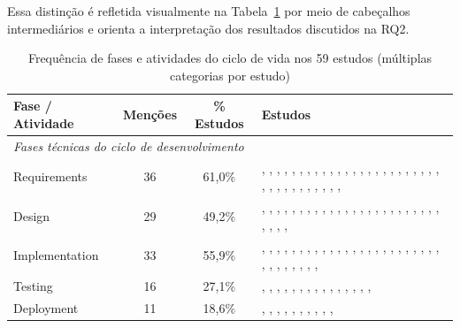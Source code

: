 Essa distinção é refletida visualmente na Tabela~\ref{tab:sdlc} por meio de cabeçalhos intermediários e orienta a interpretação dos resultados discutidos na RQ2.

\begin{table}[htbp]
\centering
\caption{Frequência de fases e atividades do ciclo de vida nos 59 estudos (múltiplas categorias por estudo)}
\label{tab:sdlc}
\scriptsize
\begin{tabular}{lccp{6.5cm}}
\hline
\textbf{Fase / Atividade} & \textbf{Menções} & \textbf{\% Estudos} & \textbf{Estudos} \\
\hline
\multicolumn{4}{l}{\textit{Fases técnicas do ciclo de desenvolvimento}} \\
\hline
Requirements & 36 & 61,0\% & \cite{S001}, \cite{S002}, \cite{S004}, \cite{S005}, \cite{S006}, \cite{S007}, \cite{S011}, \cite{S012}, \cite{S013}, \cite{S014}, \cite{S017}, \cite{S020}, \cite{S023}, \cite{S024}, \cite{S028}, \cite{S029}, \cite{S031}, \cite{S033}, \cite{S035}, \cite{S037}, \cite{S038}, \cite{S039}, \cite{S042}, \cite{S043}, \cite{S044}, \cite{S045}, \cite{S046}, \cite{S047}, \cite{S049}, \cite{S050}, \cite{S052}, \cite{S053}, \cite{S055}, \cite{S056}, \cite{S058}, \cite{S059} \\
\hline
Design & 29 & 49,2\% & \cite{S001}, \cite{S004}, \cite{S005}, \cite{S006}, \cite{S007}, \cite{S008}, \cite{S009}, \cite{S010}, \cite{S011}, \cite{S012}, \cite{S013}, \cite{S014}, \cite{S017}, \cite{S027}, \cite{S031}, \cite{S033}, \cite{S037}, \cite{S038}, \cite{S039}, \cite{S041}, \cite{S043}, \cite{S046}, \cite{S049}, \cite{S050}, \cite{S051}, \cite{S053}, \cite{S055}, \cite{S058}, \cite{S059} \\
\hline
Implementation & 33 & 55,9\% & \cite{S001}, \cite{S005}, \cite{S008}, \cite{S009}, \cite{S010}, \cite{S011}, \cite{S012}, \cite{S013}, \cite{S014}, \cite{S015}, \cite{S018}, \cite{S021}, \cite{S022}, \cite{S025}, \cite{S026}, \cite{S028}, \cite{S032}, \cite{S034}, \cite{S035}, \cite{S036}, \cite{S037}, \cite{S038}, \cite{S039}, \cite{S040}, \cite{S041}, \cite{S042}, \cite{S046}, \cite{S048}, \cite{S050}, \cite{S053}, \cite{S054}, \cite{S055}, \cite{S058} \\
\hline
Testing & 16 & 27,1\% & \cite{S001}, \cite{S004}, \cite{S005}, \cite{S010}, \cite{S013}, \cite{S014}, \cite{S017}, \cite{S021}, \cite{S022}, \cite{S034}, \cite{S036}, \cite{S039}, \cite{S040}, \cite{S045}, \cite{S052}, \cite{S053} \\
\hline
Deployment & 11 & 18,6\% & \cite{S001}, \cite{S003}, \cite{S009}, \cite{S013}, \cite{S014}, \cite{S017}, \cite{S026}, \cite{S038}, \cite{S041}, \cite{S046}, \cite{S048} \\

\end{tabular}
\end{table}
